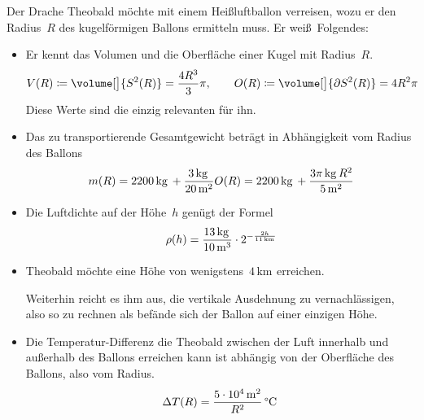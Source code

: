 \documentclass[../full]{subfiles}
\newcommand\Unit[2][\,]{
    \, \mathrm{#2}^{#1}
}
\newcommand\kg{\Unit{kg}}
\newcommand\m[1][]{\Unit[#1]{m}}
\newcommand\km[1][]{\Unit[#1]{km}}
\newcommand\Celsius{\Unit{\degree C}}
\begin{document}

    Der Drache Theobald m\"ochte mit einem Hei\ss luftballon verreisen,
    wozu er den Radius~\( R \) des kugelf\"ormigen Ballons ermitteln muss.
    Er wei\ss\ Folgendes:
    \begin{itemize}
        \item
        Er kennt das Volumen
        und die Oberfl\"ache einer Kugel mit Radius~\( R \).
        \begin{equation*}
            V \paren{R}
            \coloneqq \volume[\big]{S^2 \paren{R}} = \frac{4 R^3}{3} \pi
            , \qquad
            O \paren{R}
            \coloneqq \volume[\big]{\partial S^2 \paren{R}} = 4 R^2 \pi
        \end{equation*}
        Diese Werte sind die einzig relevanten f\"ur ihn.

        \item
        Das zu transportierende Gesamtgewicht betr\"agt
        in Abh\"angigkeit vom Radius des Ballons
        \begin{equation*}
            m \paren{R}
            = 2 200 \kg + \frac{3 \kg}{20 \m[2]} O \paren{R}
            = 2 200 \kg + \frac{3 \pi \kg R^2}{5 \m[2]}
        \end{equation*}

        \item
        Die Luftdichte auf der H\"ohe~\( h \) gen\"ugt der Formel
        \begin{equation*}
            \rho \paren{h}
            = \frac{13 \kg}{10 \m[3]} \cdot 2^{-\frac{2h}{11 \km}}
        \end{equation*}

        \item
        Theobald m\"ochte eine H\"ohe von wenigstens~\( 4 \km \) erreichen.

        Weiterhin reicht es ihm aus,
        die vertikale Ausdehnung zu vernachl\"assigen,
        also so zu rechnen
        als bef\"ande sich der Ballon auf einer einzigen H\"ohe.

        \item
        Die Temperatur-Differenz die Theobald
        zwischen der Luft innerhalb und au\ss erhalb des Ballons erreichen kann
        ist abh\"angig von der Oberfl\"ache des Ballons, also vom Radius.
        \begin{equation*}
            \Delta T \paren{R} = \frac{5 \cdot 10^4 \m[2]}{R^2} \Celsius
        \end{equation*}


\end{itemize}
\end{document}
